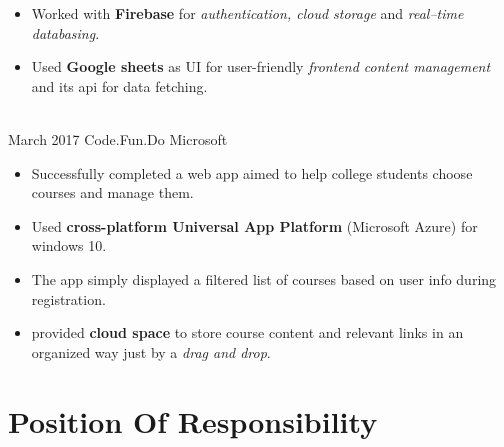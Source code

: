 \documentclass[letterpaper]{twentysecondcv} %
\begin{document}
\begin{twenty}
{\begin{itemize}
        \item Worked with \textbf{Firebase} for \textit{authentication, cloud storage} and \textit{real–time databasing}.
        \item Used \textbf{Google sheets} as UI for user-friendly \textit{frontend content management} and its api for data fetching.
    \end{itemize}
    	}
    \\
    \twentyitem
   		{March 2017}
		{}
        {Code.Fun.Do}
        {Microsoft}
        {}
        {
        \begin{itemize}
        \item Successfully completed a web app aimed to help college students choose courses and manage them.
        \item Used \textbf{cross-platform Universal App Platform} (Microsoft Azure) for windows 10.
        \item The app simply displayed a filtered list of courses based on user info during registration.
        \item provided \textbf{cloud space} to store course content and relevant links in an organized way just by a \textit{drag and drop}.
    \end{itemize}
    	}
    	
        
\end{twenty}



\section{Position Of Responsibility}
\end{document}
